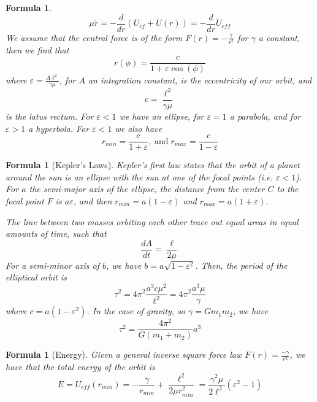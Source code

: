 \documentclass[12pt]{article}
\newtheorem{for}[thm]{Formula}
\theoremstyle{definition}
\theoremstyle{remark}
\numberwithin{equation}{section}
\begin{document}
\begin{for}
\begin{equation}
                \mu\ddot{r} = -\frac{d}{dr}(U_{cf} + U(r)) = -\frac{d}{dr}U_{eff}
        \end{equation}
        We assume that the central force is of the form $F(r) = -\frac{\gamma}{r^2}$ for $\gamma$ a constant, then we find that \begin{equation}
                r(\phi) = \frac{c}{1+\varepsilon\cos(\phi)}
        \end{equation}
        where $\varepsilon = \frac{A\ell^2}{\gamma\mu}$, for $A$ an integration constant, is the eccentricity of our orbit, and $$c = \frac{\ell^2}{\gamma\mu}$$ is the latus rectum. For $\varepsilon < 1$ we have an ellipse, for $\varepsilon = 1$ a parabola, and for $\varepsilon > 1$ a hyperbola. For $\varepsilon < 1$ we also have \begin{equation}
                r_{min} = \frac{c}{1+\varepsilon},\;\text{and}\;r_{max} = \frac{c}{1-\varepsilon}
        \end{equation}
\end{for}

\begin{for}[Kepler's Laws]
        Kepler's first law states that the orbit of a planet around the sun is an ellipse with the sun at one of the focal points (i.e. $\varepsilon < 1$). For $a$ the semi-major axis of the ellipse, the distance from the center $C$ to the focal point $F$ is $a\varepsilon$, and then $r_{min} = a(1-\varepsilon)$ and $r_{max} = a(1+\varepsilon)$. 

        The line between two masses orbiting each other trace out equal areas in equal amounts of time, such that \begin{equation}
                \frac{dA}{dt} = \frac{\ell}{2\mu}
        \end{equation}
        For a semi-minor axis of $b$, we have $b = a\sqrt{1-\varepsilon^2}$. Then, the period of the elliptical orbit is \begin{equation}
                \tau^2 = 4\pi^2\frac{a^3c\mu^2}{\ell^2} =  4\pi^2\frac{a^3\mu}{\gamma}
        \end{equation}
        where $c = a(1-\varepsilon^2)$. In the case of gravity, so $\gamma = Gm_1m_2$, we have \begin{equation}
                \tau^2 = \frac{4\pi^2}{G(m_1+m_2)}a^3
        \end{equation}
\end{for}


\begin{for}[Energy]
        Given a general inverse square force law $F(r) = \frac{-\gamma}{r^2}$, we have that the total energy of the orbit is \begin{equation}
                E = U_{eff}(r_{min}) = -\frac{\gamma}{r_{min}} + \frac{\ell^2}{2\mu r_{min}^2} = \frac{\gamma^2\mu}{2\ell^2}(\varepsilon^2-1)
        \end{equation}
\end{for}
\end{document}
